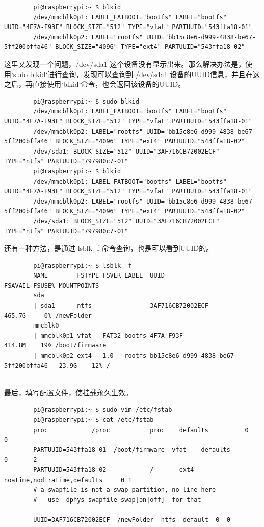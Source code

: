 \documentclass[UTF8]{article}
\begin{document}
	\begin{lstlisting}
		pi@raspberrypi:~ $ blkid
		/dev/mmcblk0p1: LABEL_FATBOOT="bootfs" LABEL="bootfs" UUID="4F7A-F93F" BLOCK_SIZE="512" TYPE="vfat" PARTUUID="543ffa18-01"
		/dev/mmcblk0p2: LABEL="rootfs" UUID="bb15c8e6-d999-4838-be67-5ff200bffa46" BLOCK_SIZE="4096" TYPE="ext4" PARTUUID="543ffa18-02"
	\end{lstlisting}
	
	这里又发现一个问题，/dev/sda1 这个设备没有显示出来。那么解决办法是，使用`sudo blkid`进行查询，发现可以查询到 /dev/sda1 设备的UUID信息，并且在这之后，再直接使用`blkid`命令，也会返回该设备的UUID。
	
	\begin{lstlisting}
		pi@raspberrypi:~ $ sudo blkid
		/dev/mmcblk0p1: LABEL_FATBOOT="bootfs" LABEL="bootfs" UUID="4F7A-F93F" BLOCK_SIZE="512" TYPE="vfat" PARTUUID="543ffa18-01"
		/dev/mmcblk0p2: LABEL="rootfs" UUID="bb15c8e6-d999-4838-be67-5ff200bffa46" BLOCK_SIZE="4096" TYPE="ext4" PARTUUID="543ffa18-02"
		/dev/sda1: BLOCK_SIZE="512" UUID="3AF716CB72002ECF" TYPE="ntfs" PARTUUID="797980c7-01"
		pi@raspberrypi:~ $ blkid
		/dev/mmcblk0p1: LABEL_FATBOOT="bootfs" LABEL="bootfs" UUID="4F7A-F93F" BLOCK_SIZE="512" TYPE="vfat" PARTUUID="543ffa18-01"
		/dev/mmcblk0p2: LABEL="rootfs" UUID="bb15c8e6-d999-4838-be67-5ff200bffa46" BLOCK_SIZE="4096" TYPE="ext4" PARTUUID="543ffa18-02"
		/dev/sda1: BLOCK_SIZE="512" UUID="3AF716CB72002ECF" TYPE="ntfs" PARTUUID="797980c7-01"
	\end{lstlisting}
	
	还有一种方法，是通过 lsblk -f 命令查询，也是可以看到UUID的。
	
	\begin{lstlisting}
		pi@raspberrypi:~ $ lsblk -f
		NAME        FSTYPE FSVER LABEL  UUID                                 FSAVAIL FSUSE% MOUNTPOINTS
		sda
		|-sda1      ntfs                3AF716CB72002ECF                      465.7G     0% /newFolder
		mmcblk0
		|-mmcblk0p1 vfat   FAT32 bootfs 4F7A-F93F                             414.8M    19% /boot/firmware
		|-mmcblk0p2 ext4   1.0   rootfs bb15c8e6-d999-4838-be67-5ff200bffa46   23.9G    12% /
		
	\end{lstlisting}
	
	最后，填写配置文件，使挂载永久生效。
	
	\begin{lstlisting}
		pi@raspberrypi:~ $ sudo vim /etc/fstab
		pi@raspberrypi:~ $ cat /etc/fstab
		proc            /proc           proc    defaults          0       0
		PARTUUID=543ffa18-01  /boot/firmware  vfat    defaults          0       2
		PARTUUID=543ffa18-02            /       ext4    noatime,nodiratime,defaults     0 1
		# a swapfile is not a swap partition, no line here
		#   use  dphys-swapfile swap[on|off]  for that
		
		UUID=3AF716CB72002ECF  /newFolder  ntfs  default  0  0
		
	\end{lstlisting}
	
\end{document}
